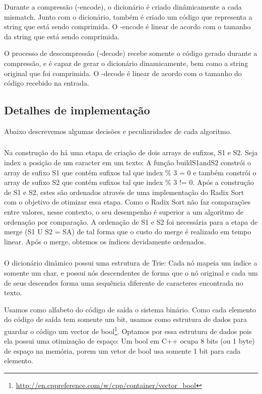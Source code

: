 Durante a compressão (\lz-encode), o dicionário é criado dinâmicamente a cada
mismatch. Junto com o dicionário, também é criado um código que representa a
string que está sendo comprimida. O \lz-encode é linear de acordo
com o tamanho da string que está sendo comprimida.

O processo de descompressão (\lz-decode) recebe somente o código gerado durante
a compressão, e é capaz de gerar o dicionário dinamicamente, bem como a string
original que foi comprimida. O \lz-decode é linear de acordo com o tamanho do
código recebido na entrada.


\subsection{Detalhes de implementação}
Abaixo descrevemos algumas decisões e peculiaridades de cada algoritmo.

\subsubsection{\lsa}

Na construção do \lsa há uma etapa de criação de dois arrays de sufixos, S1 e S2.
Seja index a posição de um caracter em um texto:  A função buildS1andS2 constrói
o array de sufixo S1 que contém sufixos tal que index \% 3 = 0 e também constrói
o array de sufixo S2 que contém sufixos tal que index \% 3 != 0. Após a
construção de S1 e S2, estes são ordenados através de uma implementação do Radix
Sort com o objetivo de otimizar essa etapa. Como o Radix Sort não faz
comparações entre valores, nesse contexto, o seu desempenho é superior a um
algoritmo de ordenação por comparação. A ordenação de S1 e S2 foi necessária
para a etapa de merge (S1  U  S2 = SA)  de tal forma que o custo do merge é
realizado em tempo linear. Após o merge, obtemos os índices devidamente
ordenados.


\subsubsection{\lz}
O dicionário dinâmico possui uma estrutura de Trie: Cada nó mapeia um índice a
somente um char, e possui nós descendentes de forma que o nó original e cada um
de seus descendes forma uma sequência diferente de caracteres encontrada no
texto.

Usamos como alfabeto do código de saída o sistema binário. Como cada elemento do
código de saída tem somente um bit, usamos como estrutura de dados para guardar
o código um vector de
bool\footnote{\url{http://en.cppreference.com/w/cpp/container/vector_bool}}.
Optamos por essa estrutura de dados pois ela possui uma otimização de espaço:
Um bool em C++ ocupa 8 bits (ou 1 byte) de espaço na memória, porem um vetor de
bool usa somente 1 bit para cada elemento.

